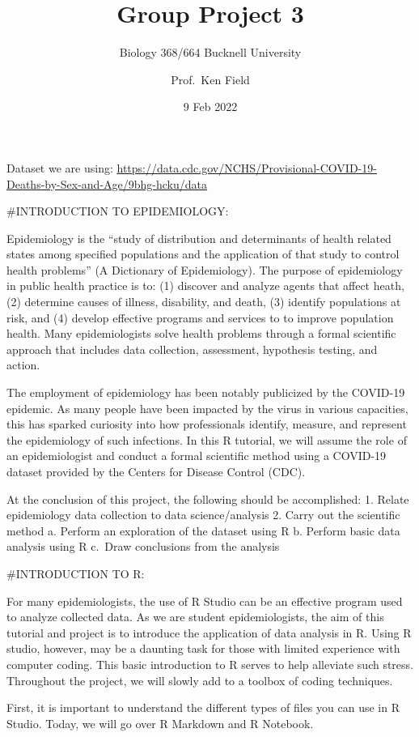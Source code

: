 \documentclass[
]{article}
\title{Group Project 3}
\subtitle{Biology 368/664 Bucknell University}
\author{Prof.~Ken Field}
\date{9 Feb 2022}
\begin{document}
\maketitle

Dataset we are using:
\url{https://data.cdc.gov/NCHS/Provisional-COVID-19-Deaths-by-Sex-and-Age/9bhg-hcku/data}

\#INTRODUCTION TO EPIDEMIOLOGY:

Epidemiology is the ``study of distribution and determinants of health
related states among specified populations and the application of that
study to control health problems'' (A Dictionary of Epidemiology). The
purpose of epidemiology in public health practice is to: (1) discover
and analyze agents that affect heath, (2) determine causes of illness,
disability, and death, (3) identify populations at risk, and (4) develop
effective programs and services to to improve population health. Many
epidemiologists solve health problems through a formal scientific
approach that includes data collection, assessment, hypothesis testing,
and action.

The employment of epidemiology has been notably publicized by the
COVID-19 epidemic. As many people have been impacted by the virus in
various capacities, this has sparked curiosity into how professionals
identify, measure, and represent the epidemiology of such infections. In
this R tutorial, we will assume the role of an epidemiologist and
conduct a formal scientific method using a COVID-19 dataset provided by
the Centers for Disease Control (CDC).

At the conclusion of this project, the following should be accomplished:
1. Relate epidemiology data collection to data science/analysis 2. Carry
out the scientific method a. Perform an exploration of the dataset using
R b. Perform basic data analysis using R c.~Draw conclusions from the
analysis

\#INTRODUCTION TO R:

For many epidemiologists, the use of R Studio can be an effective
program used to analyze collected data. As we are student
epidemiologists, the aim of this tutorial and project is to introduce
the application of data analysis in R. Using R studio, however, may be a
daunting task for those with limited experience with computer coding.
This basic introduction to R serves to help alleviate such stress.
Throughout the project, we will slowly add to a toolbox of coding
techniques.

First, it is important to understand the different types of files you
can use in R Studio. Today, we will go over R Markdown and R Notebook.
\end{document}
